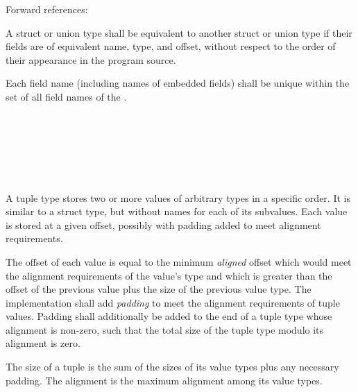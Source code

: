 Forward references: 

\specsubsubitem
A struct or union type shall be equivalent to another struct or union type if
their fields are of equivalent name, type, and offset, without respect to the
order of their appearance in the program source.


\specsubsubitem
Each field name (including names of embedded fields) shall be unique within the
set of all field names of the .


\begin{grammar}
 \\
	\terminal{(}  \terminal{)} \\

 \\
	 \terminal{,}  \optional{\terminal{,}}\\
	 \terminal{,}  \\
\end{grammar}

\specsubsubitem
A tuple type stores two or more values of arbitrary types in a specific order.
It is similar to a struct type, but without names for each of its subvalues.
Each value is stored at a given offset, possibly with padding added to meet
alignment requirements.

\specsubsubitem
The offset of each value is equal to the minimum \textit{aligned} offset which
would meet the alignment requirements of the value's type and which is greater
than the offset of the previous value plus the size of the previous value type.
The implementation shall add \textit{padding} to meet the alignment
requirements of tuple values. Padding shall additionally be added to the end of
a tuple type whose alignment is non-zero, such that the total size of the tuple
type modulo its alignment is zero.

\specsubsubitem
The size of a tuple is the sum of the sizes of its value types plus any necessary
padding. The alignment is the maximum alignment among its value types.

